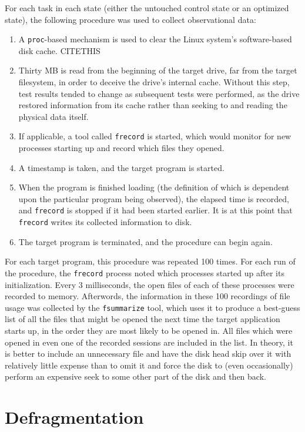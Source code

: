 \documentclass[10pt,twocolumn,letterpaper]{article}
\begin{document}
For each task in each state (either the untouched control state or an optimized state), the
following procedure was used to collect observational data:
\begin{enumerate}
\item A \texttt{proc}-based mechanism is used to clear the Linux system's software-based disk cache. CITETHIS
\item Thirty MB is read from the beginning of the target drive, far from the target filesystem, in order to deceive the drive's internal cache. Without this step, test results tended to change as subsequent tests were performed, as the drive restored information from its cache rather than seeking to and reading the physical data itself.
\item If applicable, a tool called \texttt{frecord} is started, which would monitor for new processes starting up and record which
files they opened.
\item A timestamp is taken, and the target program is started.
\item When the program is finished loading (the definition of which is dependent upon the particular program being observed), the elapsed time is recorded, and \texttt{frecord} is stopped if it had been started earlier. It is at this
point that \texttt{frecord} writes its collected information to disk.
\item The target program is terminated, and the procedure can begin again.
\end{enumerate}

For each target program, this procedure was repeated 100 times. For each run of the procedure, the \texttt{frecord}
process noted which processes started up after its initialization. Every 3 milliseconds, the open files of each
of these processes were recorded to memory. Afterwords, the information in these 100 recordings of file usage
was collected by the \texttt{fsummarize} tool, which uses it to produce a best-guess list of all the files
that might be opened the next time the target application starts up, in the order they are most likely to be
opened in. All files which were opened in even one of the recorded sessions are included in the list. In theory,
it is better to include an unnecessary file and have the disk head skip over it with relatively little expense than to omit it and force the disk to (even occasionally) perform an expensive seek to some other part of the disk
and then back.

\section{Defragmentation}
\end{document}
